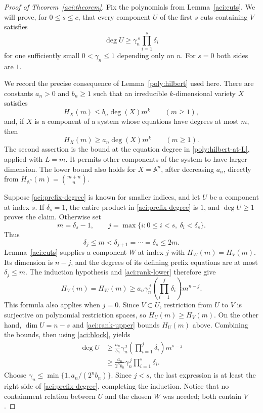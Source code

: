 \begin{proof}[Proof of Theorem~\ref{aci:theorem}]
Fix the polynomials from Lemma~\ref{aci:cuts}.  We will prove, for
$0\le s\le c$, that every component $U$ of the first $s$ cuts
containing $V$ satisfies
\begin{equation}
 \deg U\ge\gamma_n^{\,s}\prod_{i=1}^s\delta_i
 \label{aci:prefix-degree}
\end{equation}
for one sufficiently small $0<\gamma_n\le1$ depending only on $n$.
For $s=0$ both sides are $1$.

We record the precise consequence of Lemma~\ref{poly:hilbert} used
here.  There are constants $a_n>0$ and $b_n\ge1$ such that an
irreducible $k$-dimensional variety $X$ satisfies
\begin{equation}
 H_X(m)\le b_n\deg(X)m^k\qquad(m\ge1),
 \label{aci:rank-upper}
\end{equation}
and, if $X$ is a component of a system whose equations have degrees at
most $m$, then
\begin{equation}
 H_X(m)\ge a_n\deg(X)m^k\qquad(m\ge1).
 \label{aci:rank-lower}
\end{equation}
The second assertion is the bound at the equation degree in
\eqref{poly:hilbert-at-L}, applied with $L=m$.  It permits other
components of the system to have larger dimension.  The lower bound
also holds for $X=\mathbb A^n$, after decreasing $a_n$, directly from
$H_{\mathbb A^n}(m)=\binom{m+n}{n}$.

Suppose \eqref{aci:prefix-degree} is known for smaller indices, and
let $U$ be a component at index $s$.  If $\delta_s=1$, the entire
product in \eqref{aci:prefix-degree} is $1$, and $\deg U\ge1$ proves
the claim.  Otherwise set
\[
 m=\delta_s-1,\qquad
 j=\max\{i:0\le i<s,\ \delta_i<\delta_s\}.
\]
Thus
\begin{equation}
 \delta_j\le m<\delta_{j+1}
   =\cdots=\delta_s\le2m.
 \label{aci:block}
\end{equation}
Lemma~\ref{aci:cuts} supplies a component $W$ at index $j$ with
$H_W(m)=H_V(m)$.  Its dimension is $n-j$, and the degrees of its
defining prefix equations are at most $\delta_j\le m$.
The induction hypothesis and \eqref{aci:rank-lower} therefore give
\[
 H_V(m)=H_W(m)
 \ge a_n\gamma_n^{\,j}
       \left(\prod_{i=1}^j\delta_i\right)m^{n-j}.
\]
This formula also applies when $j=0$.  Since $V\subset U$, restriction
from $U$ to $V$ is surjective on polynomial restriction spaces, so
$H_U(m)\ge H_V(m)$.  On the other hand, $\dim U=n-s$ and
\eqref{aci:rank-upper} bounds $H_U(m)$ above.  Combining the bounds,
then using \eqref{aci:block}, yields
\[
 \begin{split}
 \deg U
 &\ge \frac{a_n}{b_n}\gamma_n^{\,j}
       \left(\prod_{i=1}^j\delta_i\right)m^{s-j}\\
 &\ge \frac{a_n}{2^n b_n}\gamma_n^{\,j}
       \prod_{i=1}^s\delta_i.
 \end{split}
\]
Choose $\gamma_n\le\min\{1,a_n/(2^n b_n)\}$.  Since $j<s$, the
last expression is at least the right side of
\eqref{aci:prefix-degree}, completing the induction.  Notice that no
containment relation between $U$ and the chosen $W$ was needed; both
contain $V$.


\end{proof}
